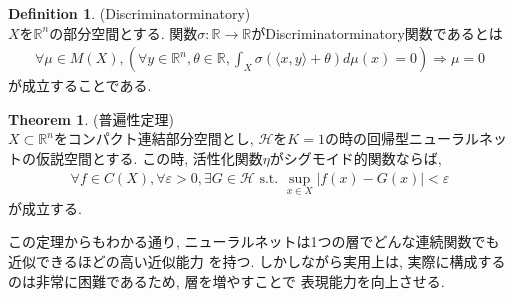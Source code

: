 \documentclass[11pt, a4paper, dvipdfmx]{jsarticle}
\theoremstyle{definition}
\newtheorem{Definition+}[Axiom+]{Definition}
\newtheorem{Theorem+}[Axiom+]{Theorem}
\newcommand{\R}{\mathbb{R}}
\newcommand{\Hil}{\mathcal{H}}
\newcommand{\e}{\varepsilon}
\def\inner<#1>{\langle #1 \rangle}
\begin{document}
\begin{Definition+}(Discriminatorminatory)\\
    $X$を$\R^n$の部分空間とする. 関数$\sigma:\R\to\R$がDiscriminatorminatory関数であるとは
    \begin{align*}
        \forall\mu\in M(X), \left(\forall y\in\R^n, \theta\in\R, \int_{X}\sigma(\inner<x, y> + \theta)d\mu(x) = 0\right)\Longrightarrow\mu = 0
    \end{align*}
    が成立することである. 
\end{Definition+}
\begin{Theorem+}(普遍性定理)\\
    $X\subset\R^n$をコンパクト連結部分空間とし, $\Hil$を$K = 1$の時の回帰型ニューラルネットの仮説空間とする. 
    この時, 活性化関数$\eta$がシグモイド的関数ならば, 
    \begin{align*}
        \forall f\in C(X), \forall\e> 0, \exists G\in\Hil\text{ s.t. } \sup_{x\in X}|f(x) - G(x)| < \e
    \end{align*}
    が成立する. 
\end{Theorem+}
この定理からもわかる通り, ニューラルネットは1つの層でどんな連続関数でも近似できるほどの高い近似能力
を持つ. しかしながら実用上は, 実際に構成するのは非常に困難であるため, 層を増やすことで
表現能力を向上させる.
\end{document}
